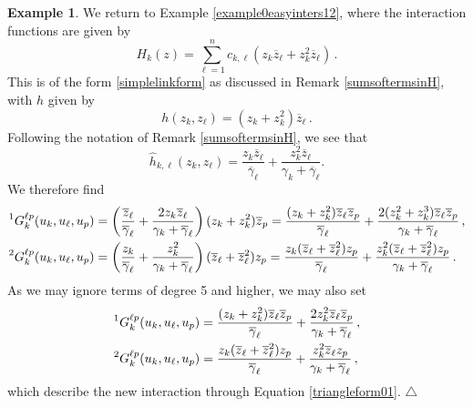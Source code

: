 \documentclass[12pt]{article}
\theoremstyle{plain}
\theoremstyle{definition}
\newtheorem{ex}[thr]{Example}
\theoremstyle{remark}
\theoremstyle{remark}
\begin{document}
\begin{ex}\label{secondspecialcase}
We return to Example \ref{example0easyinters12}, where the interaction functions are given by
\begin{equation}
 H_k(z) = \sum_{\ell=1}^n c_{k, \ell}(z_k\overline{z}_\ell + z_k^2\overline{z}_{\ell})\, .
\end{equation}
This is of the form \eqref{simplelinkform} as discussed in Remark \ref{sumsoftermsinH}, with $h$ given by
\begin{equation}
h(z_k, z_{\ell}) =  (z_k + z_k^2)\overline{z}_\ell\, .
\end{equation}
Following the notation of Remark \ref{sumsoftermsinH}, we see that
\begin{equation}
\widehat{h}_{k, \ell}(z_k, z_{\ell}) = \frac{z_k\overline{z}_\ell}{\overline{\gamma}_{\ell}} + \frac{z_k^2\overline{z}_{\ell}}{\gamma_k + \overline{\gamma}_{\ell}}.
\end{equation} 
We therefore find 
\begin{align}\label{2of1G2Gal}
\prescript{1}{}{G}_{k}^{\ell p}(u_k, u_{\ell}, u_p) &= \left(\frac{\overline{z}_\ell}{\overline{\gamma}_{\ell}} + \frac{2z_k\overline{z}_{\ell}}{\gamma_k + \overline{\gamma}_{\ell}}\right)(z_k + z_k^2)\overline{z}_p  = \frac{(z_k + z_k^2)\overline{z}_\ell \overline{z}_p}{\overline{\gamma}_{\ell}} + \frac{2(z^2_k + z_k^3)\overline{z}_{\ell}\overline{z}_p}{\gamma_k + \overline{\gamma}_{\ell}}\, , \\ \nonumber
\prescript{2}{}{G}_{k}^{\ell p}(u_k, u_{\ell}, u_p) &= \left(\frac{z_k}{\overline{\gamma}_{\ell}} + \frac{z_k^2}{\gamma_k + \overline{\gamma}_{\ell}} \right)(\overline{z}_{\ell} + \overline{z}_{\ell}^2){z}_p =  \frac{z_k(\overline{z}_{\ell} + \overline{z}_{\ell}^2){z}_p}{\overline{\gamma}_{\ell}} + \frac{z_k^2(\overline{z}_{\ell} + \overline{z}_{\ell}^2){z}_p}{\gamma_k + \overline{\gamma}_{\ell}} \, .
\end{align}
As we may ignore terms of degree 5 and higher, we may also set
\begin{align}\label{2of1G2Gall}
\prescript{1}{}{G}_{k}^{\ell p}(u_k, u_{\ell}, u_p) &= \frac{(z_k + z_k^2)\overline{z}_\ell \overline{z}_p}{\overline{\gamma}_{\ell}} + \frac{2z^2_k\overline{z}_{\ell}\overline{z}_p}{\gamma_k + \overline{\gamma}_{\ell}}\, , \\ \nonumber
\prescript{2}{}{G}_{k}^{\ell p}(u_k, u_{\ell}, u_p) &=  \frac{z_k(\overline{z}_{\ell} + \overline{z}_{\ell}^2){z}_p}{\overline{\gamma}_{\ell}} + \frac{z_k^2\overline{z}_{\ell}{z}_p}{\gamma_k + \overline{\gamma}_{\ell}} \, ,
\end{align}
which describe the new interaction through Equation \eqref{triangleform01}. \hfill $\triangle$
\end{ex}
\end{document}
